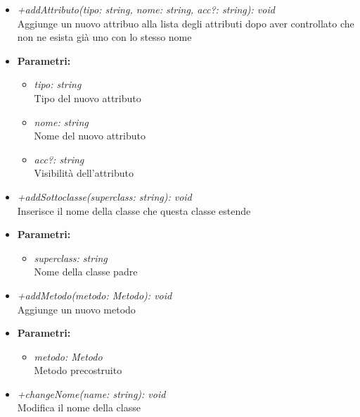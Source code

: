 \begin{itemize}
\begin{itemize}
\begin{itemize}
            				\end{itemize}
            			\item \emph{+addAttributo(tipo: string, nome: string, acc?: string): void}\\
            			Aggiunge un nuovo attribuo alla lista degli attributi dopo aver controllato che non ne esista già uno con lo stesso nome
            			\item \textbf{Parametri:}\\
            				\begin{itemize}
            					\item \emph{tipo: string}\\
            					Tipo del nuovo attributo
            					\item \emph{nome: string}\\
            					Nome del nuovo attributo
            					\item \emph{acc?: string}\\
            					Visibilità dell'attributo
            				\end{itemize}
            			\item \emph{+addSottoclasse(superclass: string): void}\\
            			Inserisce il nome della classe che questa classe estende
            			\item \textbf{Parametri:}\\
            				\begin{itemize}
            					\item \emph{superclass: string}\\
            					Nome della classe padre
            				\end{itemize}
            			\item \emph{+addMetodo(metodo: Metodo): void}\\
            			Aggiunge un nuovo metodo
            			\item \textbf{Parametri:}\\
            				\begin{itemize}
            					\item \emph{metodo: Metodo}\\
            					Metodo precostruito
            				\end{itemize}
            			\item \emph{+changeNome(name: string): void}\\
            			Modifica il nome della classe

\end{itemize}
\end{itemize}

